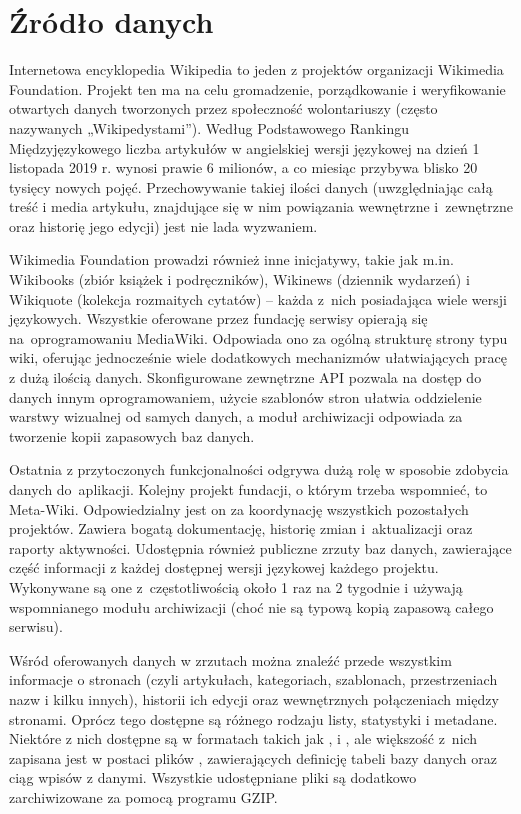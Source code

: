 \section{Źródło danych}
\label{sec:data-source}
Internetowa encyklopedia Wikipedia to jeden z projektów organizacji Wikimedia Foundation. Projekt ten ma na celu gromadzenie, porządkowanie i weryfikowanie otwartych danych tworzonych przez społeczność wolontariuszy (często nazywanych „Wikipedystami”). Według Podstawowego Rankingu Międzyjęzykowego \cite{Wiki:PodstawowyRanking} liczba artykułów w angielskiej wersji językowej na dzień 1 listopada 2019 r. wynosi prawie 6 milionów, a co miesiąc przybywa blisko 20 tysięcy nowych pojęć. Przechowywanie takiej ilości danych (uwzględniając całą treść i media artykułu, znajdujące się w nim powiązania wewnętrzne i~zewnętrzne oraz historię jego edycji) jest nie lada wyzwaniem.

Wikimedia Foundation prowadzi również inne inicjatywy, takie jak m.in. Wikibooks (zbiór książek i podręczników), Wikinews (dziennik wydarzeń) i Wikiquote (kolekcja rozmaitych cytatów) – każda z~nich posiadająca wiele wersji językowych. Wszystkie oferowane przez fundację serwisy opierają się na~oprogramowaniu MediaWiki. Odpowiada ono za ogólną strukturę strony typu wiki, oferując jednocześnie wiele dodatkowych mechanizmów ułatwiających pracę z dużą ilością danych. Skonfigurowane zewnętrzne API pozwala na dostęp do danych innym oprogramowaniem, użycie szablonów stron ułatwia oddzielenie warstwy wizualnej od samych danych, a moduł archiwizacji odpowiada za tworzenie kopii zapasowych baz danych.

Ostatnia z przytoczonych funkcjonalności odgrywa dużą rolę w sposobie zdobycia danych do~aplikacji. Kolejny projekt fundacji, o którym trzeba wspomnieć, to Meta-Wiki. Odpowiedzialny jest on za koordynację wszystkich pozostałych projektów. Zawiera bogatą dokumentację, historię zmian i~aktualizacji oraz raporty aktywności. Udostępnia również publiczne zrzuty baz danych, zawierające część informacji z każdej dostępnej wersji językowej każdego projektu. Wykonywane są one z~częstotliwością około 1 raz na 2 tygodnie i używają wspomnianego modułu archiwizacji (choć nie są typową kopią zapasową całego serwisu).

Wśród oferowanych danych w zrzutach można znaleźć przede wszystkim informacje o stronach (czyli artykułach, kategoriach, szablonach, przestrzeniach nazw i kilku innych), historii ich edycji oraz wewnętrznych połączeniach między stronami. Oprócz tego dostępne są różnego rodzaju listy, statystyki i metadane. Niektóre z nich dostępne są w formatach takich jak ,  i , ale większość z~nich zapisana jest w postaci plików , zawierających definicję tabeli bazy danych oraz ciąg wpisów z danymi. Wszystkie udostępniane pliki są dodatkowo zarchiwizowane za pomocą programu GZIP.